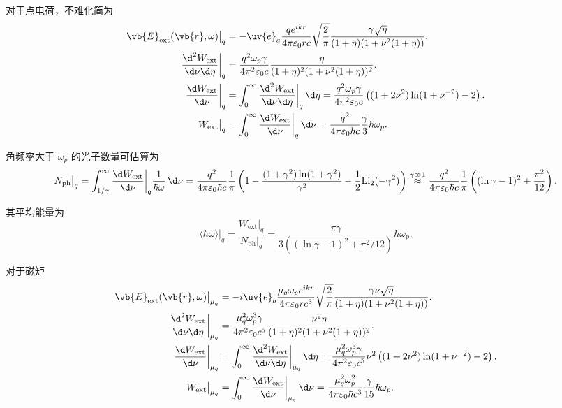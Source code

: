 对于点电荷，不难化简为
\begin{align*}
	\vb{E}_{\mathrm{ext}}(\vb{r}, \omega)\big|_{q} &= -\uv{e}_{a} \frac{q e^{i k r}}{4\pi \varepsilon_{0} r c} \sqrt{\frac{2}{\pi}} \frac{\gamma \sqrt{\eta}}{(1 + \eta) (1 + \nu^{2} (1 + \eta))}.\\\frac{\d^{2} W_{\mathrm{ext}}}{\d \nu \d \eta}\bigg|_{q} &= \frac{q^{2} \omega_{p} \gamma}{4\pi^{2} \varepsilon_{0} c} \frac{\eta}{(1 + \eta)^{2} (1 + \nu^{2} (1 + \eta))^{2}}.\\\frac{\d  W_{\mathrm{ext}}}{\d \nu}\bigg|_{q} &= \int_{0}^{\infty} \frac{\d^{2} W_{\mathrm{ext}}}{\d \nu \d \eta}\bigg|_{q} \, \d \eta = \frac{q^{2} \omega_{p} \gamma}{4\pi^{2} \varepsilon_{0} c} \left( (1 + 2\nu^{2}) \ln(1 + \nu^{-2}) - 2 \right).\\W_{\mathrm{ext}}\big|_{q} &= \int_{0}^{\infty} \frac{\d  W_{\mathrm{ext}}}{\d \nu}\bigg|_{q} \, \d \nu = \frac{q^{2}}{4\pi \varepsilon_{0} \hbar c} \frac{\gamma}{3} \hbar \omega_{p}.
\end{align*}

角频率大于 \(\omega_{p}\) 的光子数量可估算为
\begin{equation*}
	N_{\mathrm{ph}}\big|_{q} = \int_{1/\gamma}^{\infty} \frac{\d  W_{\mathrm{ext}}}{\d \nu}\bigg|_{q} \frac{1}{\hbar \omega} \, \d \nu = \frac{q^{2}}{4\pi \varepsilon_{0} \hbar c} \frac{1}{\pi} \left( 1 - \frac{(1 + \gamma^{2}) \ln(1 + \gamma^{2})}{\gamma^{2}} - \frac{1}{2} \mathrm{Li}_{2}(-\gamma^{2}) \right) \overset{\gamma \gg 1}{\approx} \frac{q^{2}}{4\pi \varepsilon_{0} \hbar c} \frac{1}{\pi} \left( (\ln \gamma - 1)^{2} + \frac{\pi^{2}}{12} \right).
\end{equation*}

其平均能量为
\begin{equation*}
	\langle \hbar\omega \rangle\big|_{q} = \frac{W_{\mathrm{ext}}|_{q}}{N_{\mathrm{ph}}|_{q}} = \frac{\pi \gamma}{3 \left( (\ln \gamma - 1)^{2} + \pi^2/12 \right)} \hbar\omega_{p}.
\end{equation*}

对于磁矩
\begin{align*}
	\vb{E}_{\mathrm{ext}}(\vb{r}, \omega)\big|_{\mu_{q}} &= -i \uv{e}_{b} \frac{\mu_{q} \omega_{p} e^{i k r}}{4\pi \varepsilon_{0} r c^{3}} \sqrt{\frac{2}{\pi}} \frac{\gamma \nu \sqrt{\eta}}{(1 + \eta) (1 + \nu^{2} (1 + \eta))}.\\\frac{\d^{2} W_{\mathrm{ext}}}{\d \nu \d \eta}\bigg|_{\mu_{q}} &= \frac{\mu_{q}^{2} \omega_{p}^{3} \gamma}{4\pi^{2} \varepsilon_{0} c^{5}} \frac{\nu^{2} \eta}{(1 + \eta)^{2} (1 + \nu^{2} (1 + \eta))^{2}}.\\\frac{\d  W_{\mathrm{ext}}}{\d \nu}\bigg|_{\mu_{q}} &= \int_{0}^{\infty} \frac{\d^{2} W_{\mathrm{ext}}}{\d \nu \d \eta}\bigg|_{\mu_{q}} \, \d \eta = \frac{\mu_{q}^{2} \omega_{p}^{3} \gamma}{4\pi^{2} \varepsilon_{0} c^{5}} \nu^{2} \left( (1 + 2\nu^{2}) \ln(1 + \nu^{-2}) - 2 \right).\\W_{\mathrm{ext}}\big|_{\mu_{q}} &= \int_{0}^{\infty} \frac{\d  W_{\mathrm{ext}}}{\d \nu}\bigg|_{\mu_{q}} \, \d \nu = \frac{\mu_{q}^{2} \omega_{p}^{2}}{4\pi \varepsilon_{0} \hbar c^{3}} \frac{\gamma}{15} \hbar \omega_{p}.
\end{align*}

